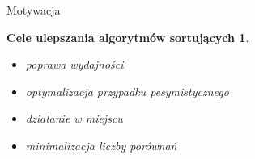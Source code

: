 \begin{frame}[squeeze]{Motywacja}

	\newtheorem*{sortimporove*}{Cele ulepszania algorytmów sortujących}
	\begin{sortimporove*}
		\begin{itemize}
			\item poprawa wydajności
			\item optymalizacja przypadku pesymistycznego
			\item działanie w miejscu
			\item minimalizacja liczby porównań
		\end{itemize}
	\end{sortimporove*}

\end{frame}